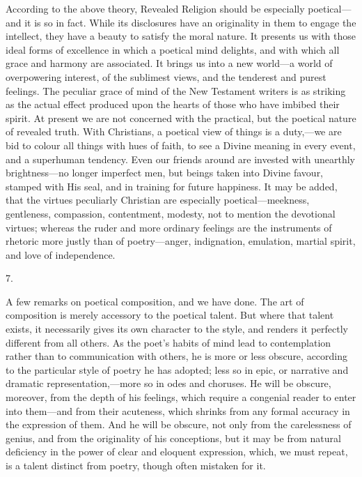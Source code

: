 According to the above theory, Revealed Religion should be
especially poetical—and it is so in fact. While its disclosures have
an originality in them to engage the intellect, they have a beauty to
satisfy the moral nature. It presents us with those ideal forms of
excellence in which a poetical mind delights, and with which all grace
and harmony are associated. It brings us into a new world—a world of
overpowering interest, of the sublimest views, and the tenderest and
purest feelings. The peculiar grace of mind of the New Testament
writers is as striking as the actual effect produced upon the hearts
of those who have imbibed their spirit. At present we are not
concerned with the practical, but the poetical nature of revealed
truth. With Christians, a poetical view of things is a duty,—we are
bid to colour all things with hues of faith, to see a Divine meaning
in every event, and a superhuman tendency. Even our friends around are
invested with unearthly brightness—no longer imperfect men, but
beings taken into Divine favour, stamped with His seal, and in
training for future happiness. It may be added, that the virtues
peculiarly Christian are especially poetical—meekness, gentleness,
compassion, contentment, modesty, not to mention the devotional
virtues; whereas the ruder and more ordinary feelings are the
instruments of rhetoric more justly than of poetry—anger,
indignation, emulation, martial spirit, and love of independence.

7.

A few remarks on poetical composition, and we have done. The art of
composition is merely accessory to the poetical talent. But where that
talent exists, it necessarily gives its own character to the style,
and renders it perfectly different from all others. As the poet's
habits of mind lead to contemplation rather than to communication with
others, he is more or less obscure, according to the particular style
of poetry he has adopted; less so in epic, or narrative and dramatic
representation,—more so in odes and choruses. He will be obscure,
moreover, from the depth of his feelings, which require a congenial
reader to enter into them—and from their acuteness, which shrinks
from any formal accuracy in the expression of them. And he will be
obscure, not only from the carelessness of genius, and from the
originality of his conceptions, but it may be from natural deficiency
in the power of clear and eloquent expression, which, we must repeat,
is a talent distinct from poetry, though often mistaken for it.

